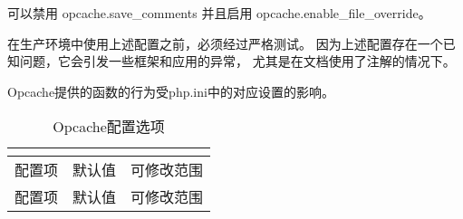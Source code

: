 可以禁用 opcache.save\_comments 并且启用 opcache.enable\_file\_override。

在生产环境中使用上述配置之前，必须经过严格测试。 因为上述配置存在一个已知问题，它会引发一些框架和应用的异常， 尤其是在文档使用了注解的情况下。

Opcache提供的函数的行为受php.ini中的对应设置的影响。

\begin{longtable}{|m{150pt}|m{40pt}|m{150pt}|}
\multicolumn{3}{r}{}
\tabularnewline\hline
配置项&默认值&可修改范围
\endhead

\caption{Opcache配置选项}\\
\hline
配置项&默认值&可修改范围
\endfirsthead

\multicolumn{3}{r}{}
\endfoot


\end{longtable}
